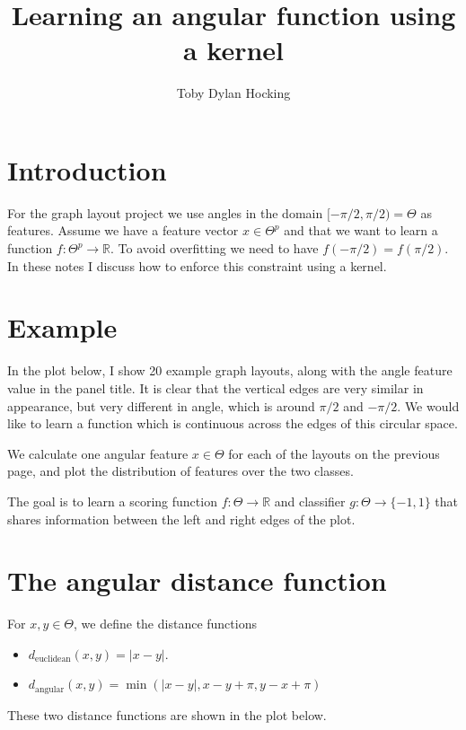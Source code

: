\documentclass[11pt]{article}
\newcommand{\RR}{\mathbb R}
\begin{document}
\title{Learning an angular function using a kernel}
\author{Toby Dylan Hocking}
\maketitle

\section{Introduction}

For the graph layout project we use angles in the domain $[-\pi/2,
\pi/2)=\Theta$ as features. Assume we have a feature vector
$x\in\Theta^p$ and that we want to learn a function
$f:\Theta^p\rightarrow\RR$. To avoid overfitting we need to have
$f(-\pi/2)=f(\pi/2)$. In these notes I discuss how to enforce this
constraint using a kernel.

\section{Example}

In the plot below, I show 20 example graph layouts, along with the
angle feature value in the panel title. It is clear that the vertical
edges are very similar in appearance, but very different in angle,
which is around $\pi/2$ and $-\pi/2$. We would like to learn a
function which is continuous across the edges of this circular space.



We calculate one angular feature $x\in\Theta$ for each of the layouts
on the previous page, and plot the distribution of features over the
two classes.



The goal is to learn a scoring function $f:\Theta\rightarrow\RR$ and
classifier $g:\Theta\rightarrow\{-1,1\}$ that shares information
between the left and right edges of the plot. 

\newpage

\section{The angular distance function}

For $x,y\in\Theta$, we define the distance functions 
\begin{itemize}
\item $d_{\text{euclidean}}(x,y)=|x-y|$.
\item $d_{\text{angular}}(x,y)=\min(|x-y|, 
x-y+\pi, 
y-x+\pi)$
\end{itemize}
These two distance functions are shown in the plot below.
\end{document}
